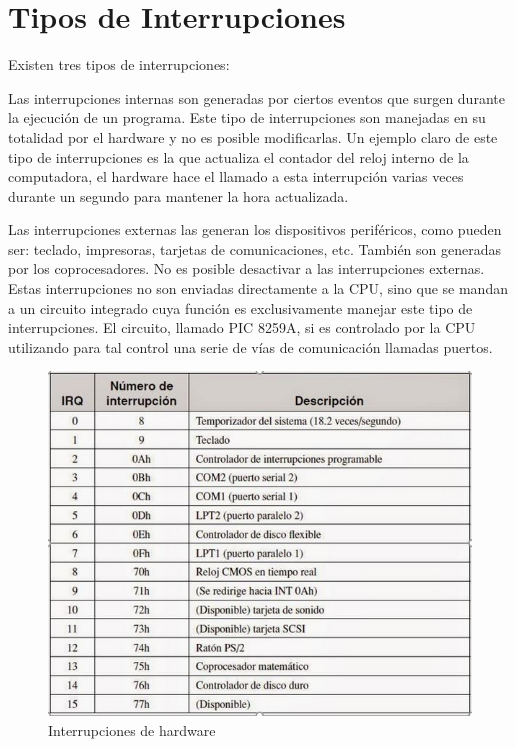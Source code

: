 \documentclass{article}
\begin{document}
\section{Tipos de Interrupciones}
Existen tres tipos de interrupciones:
Las interrupciones internas son generadas por ciertos eventos que surgen durante la ejecución de un programa.
Este tipo de interrupciones son manejadas en su totalidad por el hardware y no es posible modificarlas.
Un ejemplo claro de este tipo de interrupciones es la que actualiza el contador del reloj interno de la computadora, el hardware hace el llamado a esta interrupción varias veces durante un segundo para mantener la hora actualizada.
Las interrupciones externas las generan los dispositivos periféricos, como pueden ser: teclado, impresoras, tarjetas de comunicaciones, etc. También son generadas por los coprocesadores.
No es posible desactivar a las interrupciones externas.
Estas interrupciones no son enviadas directamente a la CPU, sino que se mandan a un circuito integrado cuya función es exclusivamente manejar este tipo de interrupciones. El circuito, llamado PIC 8259A, si es controlado por la CPU utilizando para tal control una serie de vías de comunicación llamadas puertos.

\begin{figure}[h]
\centering
\includegraphics[scale=0.7]{interrupciones}
\caption{Interrupciones de hardware \cite{interHS}}
\label{fig:interrupciones}
\end{figure}
\end{document}
